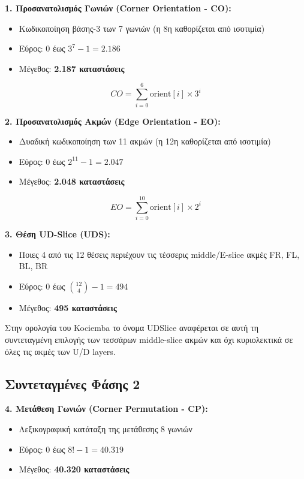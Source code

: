 \textbf{1. Προσανατολισμός Γωνιών (Corner Orientation - CO):}
\begin{itemize}
    \item Κωδικοποίηση βάσης-3 των 7 γωνιών (η 8η καθορίζεται από ισοτιμία)
    \item Εύρος: $0$ έως $3^7 - 1 = 2.186$
    \item Μέγεθος: \textbf{2.187 καταστάσεις}
\end{itemize}
\begin{equation}
    CO = \sum_{i=0}^{6} \text{orient}[i] \times 3^i
\end{equation}

\textbf{2. Προσανατολισμός Ακμών (Edge Orientation - EO):}
\begin{itemize}
    \item Δυαδική κωδικοποίηση των 11 ακμών (η 12η καθορίζεται από ισοτιμία)
    \item Εύρος: $0$ έως $2^{11} - 1 = 2.047$
    \item Μέγεθος: \textbf{2.048 καταστάσεις}
\end{itemize}
\begin{equation}
    EO = \sum_{i=0}^{10} \text{orient}[i] \times 2^i
\end{equation}

\textbf{3. Θέση UD-Slice (UDS):}
\begin{itemize}
    \item Ποιες 4 από τις 12 θέσεις περιέχουν τις τέσσερις middle/E-slice ακμές FR, FL, BL, BR
    \item Εύρος: $0$ έως $\binom{12}{4} - 1 = 494$
    \item Μέγεθος: \textbf{495 καταστάσεις}
\end{itemize}
Στην ορολογία του Kociemba το όνομα UDSlice αναφέρεται σε αυτή τη συντεταγμένη
επιλογής των τεσσάρων middle-slice ακμών και όχι κυριολεκτικά σε όλες τις ακμές
των U/D layers.

\subsection{Συντεταγμένες Φάσης 2}

\textbf{4. Μετάθεση Γωνιών (Corner Permutation - CP):}
\begin{itemize}
    \item Λεξικογραφική κατάταξη της μετάθεσης 8 γωνιών
    \item Εύρος: $0$ έως $8! - 1 = 40.319$
    \item Μέγεθος: \textbf{40.320 καταστάσεις}
\end{itemize}


